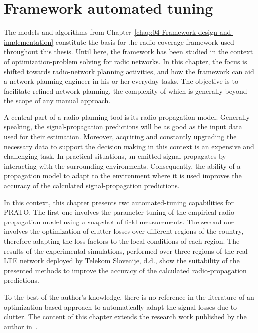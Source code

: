
\chapter{Framework automated tuning \label{chap:05-Framework_parameter_tuning}}


\noindent The models and algorithms from Chapter~\ref{chap:04-Framework-design-and-implementation}
constitute the basis for the radio-coverage framework used throughout
this thesis. Until here, the framework has been studied in the context
of optimization-problem solving for radio networks. In this chapter,
the focus is shifted towards radio-network planning activities, and
how the framework can aid a network-planning engineer in his or her
everyday tasks. The objective is to facilitate refined network planning,
the complexity of which is generally beyond the scope of any manual
approach.

A central part of a radio-planning tool is its radio-propagation model.
Generally speaking, the signal-propagation predictions will be as
good as the input data used for their estimation. Moreover, acquiring
and constantly upgrading the necessary data to support the decision
making in this context is an expensive and challenging task. In practical
situations, an emitted signal propagates by interacting with the surrounding
environments. Consequently, the ability of a propagation model to
adapt to the environment where it is used improves the accuracy of
the calculated signal-propagation predictions.

In this context, this chapter presents two automated-tuning capabilities
for PRATO. The first one involves the parameter tuning of the empirical
radio-propagation model using a snapshot of field measurements. The
second one involves the optimization of clutter losses over different
regions of the country, therefore adapting the loss factors to the
local conditions of each region. The results of the experimental simulations,
performed over three regions of the real LTE network deployed by Telekom
Slovenije, d.d., show the suitability of the presented methods to
improve the accuracy of the calculated radio-propagation predictions.

To the best of the author's knowledge, there is no reference in the
literature of an optimization-based approach to automatically adapt
the signal losses due to clutter. The content of this chapter extends
the research work published by the author in~\cite{Benedicic-An_adaptable_parallel_simulation_framework_for_LTE_coverage_planning:2013}. 

